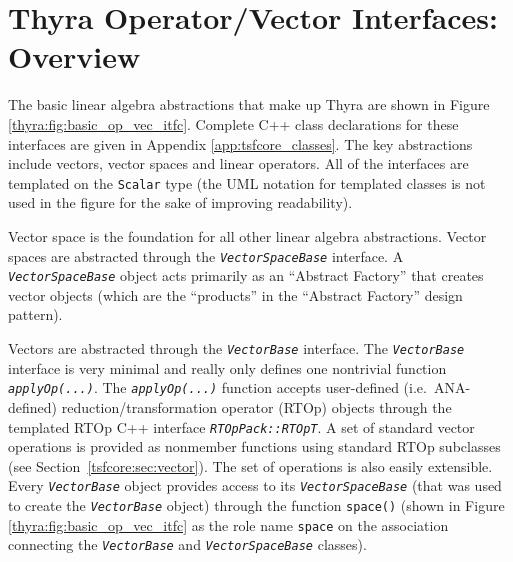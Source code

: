 \documentclass[pdf,ps2pdf,11pt]{SANDreport}
\begin{document}
%
\section{Thyra Operator/Vector Interfaces: Overview}
\label{tsfcore:sec:Thyra_core_overview}
%

The basic linear algebra abstractions that make up Thyra are shown
in Figure {}\ref{thyra:fig:basic_op_vec_itfc}.  Complete C++ class
declarations for these interfaces are given in Appendix
{}\ref{app:tsfcore_classes}.  The key abstractions include vectors,
vector spaces and linear operators.  All of the interfaces are
templated on the {}\texttt{Scalar} type (the UML notation for
templated classes is not used in the figure for the sake of improving
readability).

Vector space is the foundation for all other linear algebra
abstractions.  Vector spaces are abstracted through the
{}\texttt{\textit{Vector\-Space\-Base}} interface.  A
{}\texttt{\textit{Vector\-Space\-Base}} object acts primarily as an ``Abstract
Factory'' {}\cite{ref:gama_et_al_1995} that creates vector objects
(which are the ``products'' in the ``Abstract Factory'' design
pattern).

Vectors are abstracted through the {}\texttt{\textit{Vector\-Base}}
interface.  The {}\texttt{\textit{Vector\-Base}} interface is very minimal
and really only defines one nontrivial function
{}\texttt{\textit{applyOp(\-...)}}.  The
{}\texttt{\textit{applyOp(\-...)}} function accepts user-defined
(i.e.~ANA-defined) reduction/transformation operator (RTOp) objects
through the templated RTOp C++ interface
{}\texttt{\textit{RTOpPack::RTOpT}}.  A set of standard vector
operations is provided as nonmember functions using standard RTOp
subclasses (see Section~\ref{tsfcore:sec:vector}).  The set of
operations is also easily extensible.  Every
{}\texttt{\textit{Vector\-Base}} object provides access to its
{}\texttt{\textit{Vector\-Space\-Base}} (that was used to create the
{}\texttt{\textit{Vector\-Base}} object) through the function
{}\texttt{space()} (shown in Figure {}\ref{thyra:fig:basic_op_vec_itfc} as
the role name {}\texttt{space} on the association connecting the
{}\texttt{\textit{Vector\-Base}} and {}\texttt{\textit{Vector\-Space\-Base}}
classes).
\end{document}
